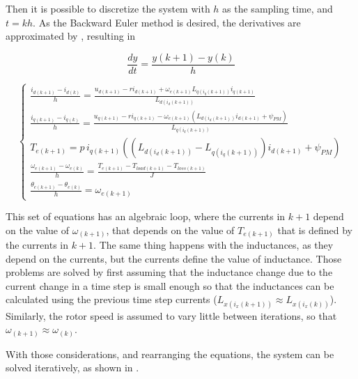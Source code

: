 Then it is possible to discretize the system with $h$ as the sampling time, and $t = kh$. As the Backward Euler method is desired, the derivatives are approximated by , resulting in 

\begin{equation}
    \frac{dy}{dt} = \frac{y(k+1) - y(k)}{h}
	\label{eq:backward_euler_example}
\end{equation}

\begin{equation}
	\left\{
	\begin{aligned}
		\frac{i_{d(k+1)}-i_{d(k)}}{h} = \frac{u_{d(k+1)} -r i_{d(k+1)} +\omega_{e(k+1)} L_{q(i_q(k+1))} i_{q(k+1)}}{L_{d(i_d(k+1))}}               \\
		\frac{i_{q(k+1)}-i_{q(k)}}{h} = \frac{u_{q(k+1)} -r i_{q(k+1)} - \omega_{e(k+1)} (L_{d(i_d(k+1))} i_{d(k+1)} +\psi_{PM})}{L_{q(i_q(k+1))}} \\
		T_{e(k+1)}  = p\, i_{q(k+1)}(( L_{d(i_d(k+1))} - L_{q(i_q(k+1))})i_{d(k+1)} + \psi_{PM})                                                   \\
		\frac{\omega_{e(k+1)} - \omega_{e(k)}}{h} = \frac{T_{e(k+1)}-T_{load(k+1)} - T_{loss(k+1)}}{J}                                             \\
		\frac{\theta_{e(k+1)} - \theta_{e(k)}}{h} = \omega_{e(k+1)}
	\end{aligned}
	\right.
	\label{eq:motor_with_inductances_discrete}
\end{equation}

This set of equations has an algebraic loop, where the currents in $k+1$ depend on the value of $\omega_{(k+1)}$, that depends on the value of $T_{e(k+1)}$ that is defined by the currents in $k+1$. The same thing happens with the inductances, as they depend on the currents, but the currents define the value of inductance. Those problems are solved by first assuming that the inductance change due to the current change in a time step is small enough so that the inductances can be calculated using the previous time step currents ($ L_{x(i_x(k+1))} \approx L_{x(i_x(k))} $). Similarly, the rotor speed is assumed to vary little between iterations, so that $\omega_{(k+1)} \approx \omega_{(k)}$.

With those considerations, and rearranging the equations, the system can be solved iteratively, as shown in .

